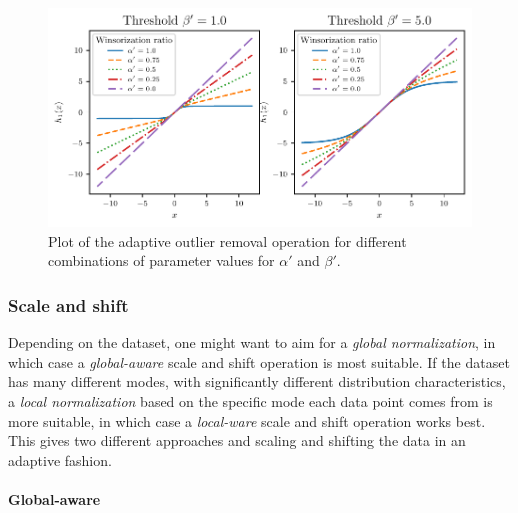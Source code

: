 \documentclass{statsmsc}
\begin{document}
\begin{figure}
\begin{center}
    \includegraphics[scale=1.0]{figures/adaptive_outlier_removal.pdf}
\end{center}
\caption{Plot of the adaptive outlier removal operation for different combinations of parameter
values for $\alpha'$ and $\beta'$.}
\label{fig:adaptive_outlier}
\end{figure}



\subsubsection{Scale and shift}%
\label{ssub:Scale and shift}

Depending on the dataset, one might want to aim for a \textit{global
normalization}, in which case a \textit{global-aware} scale and shift operation is most
suitable. If the dataset has many different modes, with significantly different distribution characteristics, a \textit{local normalization} based on the specific mode each data point comes from is more suitable, in which case a \textit{local-ware} scale and shift
operation works best. This gives two different approaches and scaling and shifting the data in an adaptive fashion.

\paragraph{Global-aware}%
\label{par:Global-aware}
\end{document}

